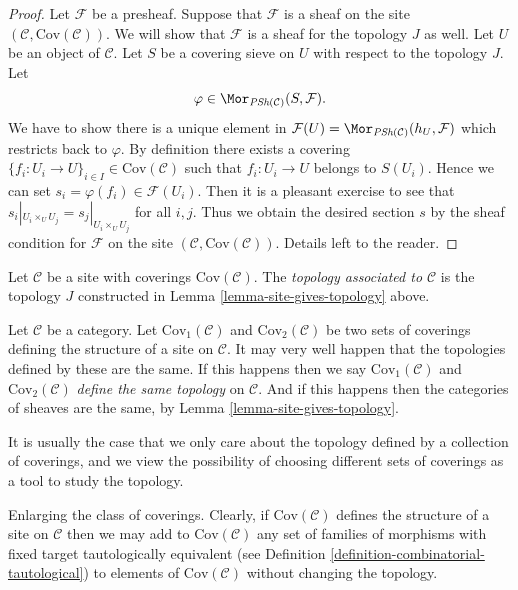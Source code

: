 \begin{proof}
\medskip\noindent
Let $\mathcal{F}$ be a presheaf. Suppose that $\mathcal{F}$
is a sheaf on the site $(\mathcal{C}, \text{Cov}(\mathcal{C}))$.
We will show that $\mathcal{F}$ is a sheaf for the topology $J$
as well. Let $U$ be an object of $\mathcal{C}$. Let
$S$ be a covering sieve on $U$ with respect to the topology $J$.
Let
$$
\varphi \in \Mor_{\textit{PSh}(\mathcal{C})}(S, \mathcal{F}).
$$
We have to show there is a unique element in
$\mathcal{F}(U) = \Mor_{\textit{PSh}(\mathcal{C})}(h_U, \mathcal{F})$
which restricts back to $\varphi$. By definition there exists
a covering $\{f_i : U_i \to U\}_{i\in I} \in \text{Cov}(\mathcal{C})$
such that $f_i : U_i \to U$ belongs to $S(U_i)$.  Hence
we can set $s_i = \varphi(f_i) \in \mathcal{F}(U_i)$.
Then it is a pleasant exercise to see that
$s_i|_{U_i \times_U U_j} = s_j|_{U_i \times_U U_j}$ for all
$i, j$. Thus we obtain the desired section $s$ by the sheaf
condition for $\mathcal{F}$ on the site
$(\mathcal{C}, \text{Cov}(\mathcal{C}))$.
Details left to the reader.
\end{proof}

\begin{definition}
\label{definition-topology-associated-site}
Let $\mathcal{C}$ be a site with coverings $\text{Cov}(\mathcal{C})$.
The {\it topology associated to $\mathcal{C}$} is the topology
$J$ constructed in Lemma \ref{lemma-site-gives-topology} above.
\end{definition}

\noindent
Let $\mathcal{C}$ be a category.
Let $\text{Cov}_1(\mathcal{C})$ and $\text{Cov}_2(\mathcal{C})$
be two sets of coverings defining the structure of a site on $\mathcal{C}$.
It may very well happen that the topologies defined
by these are the same. If this happens
then we say $\text{Cov}_1(\mathcal{C})$ and
$\text{Cov}_2(\mathcal{C})$ {\it define the same topology} on
$\mathcal{C}$. And if this happens then the categories of sheaves
are the same, by Lemma \ref{lemma-site-gives-topology}.

\medskip\noindent
It is usually the case that we only care about the topology defined
by a collection of coverings, and we view the possibility of choosing
different sets of coverings as a tool to study the topology.

\begin{remark}
\label{remark-enlarge-coverings}
Enlarging the class of coverings.
Clearly, if $\text{Cov}(\mathcal{C})$
defines the structure of a site on $\mathcal{C}$ then we may
add to $\text{Cov}(\mathcal{C})$ any set of families of morphisms with fixed target
tautologically equivalent
(see Definition \ref{definition-combinatorial-tautological})
to elements of $\text{Cov}(\mathcal{C})$ without changing the topology.
\end{remark}


